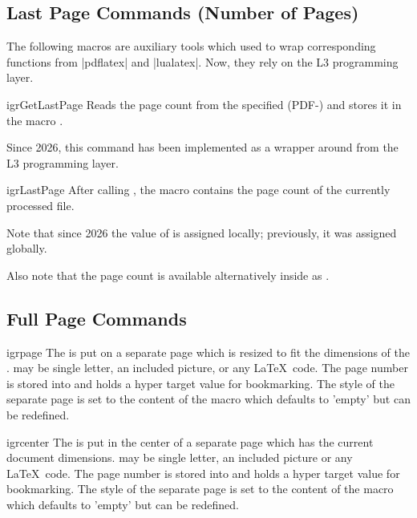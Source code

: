 \documentclass[a4paper,11pt]{ltxdoc}
\begin{document}
\subsection{Last Page Commands (Number of Pages)}

The following macros are auxiliary tools which used to wrap corresponding functions
from |pdflatex| and |lualatex|. Now, they rely on the L3 programming layer.

\begin{docCommand}[doc new and updated={2021-10-18}{2026-02-25}]{igrGetLastPage}{}
  Reads the page count from the specified (PDF-) and stores it in
  the macro .\par
  Since 2026, this command has been implemented as a wrapper around
   from the L3 programming layer.
\end{docCommand}


\begin{docCommand}[doc new and updated={2021-10-18}{2026-02-25}]{igrLastPage}{}
  After calling , the macro  contains
  the page count of the currently processed file.\par
  Note that since 2026 the value of  is assigned locally;
  previously, it was assigned globally.\par
  Also note that the page count is available alternatively inside
   as .
\end{docCommand}


\clearpage
\subsection{Full Page Commands}

\begin{docCommand}{igrpage}{}
  The  is put on a separate page which is resized to fit the
  dimensions of the .  may be single letter, an
  included picture, or any \LaTeX\ code.
  The page number is stored into  and
   holds a hyper target value for bookmarking.
  The style of the separate page is set to
  the content of the macro
   which defaults to 'empty' but can be
  redefined.
\end{docCommand}

\begin{docCommand}{igrcenter}{}
  The  is put in the center of a separate page which has the
  current document dimensions.  may be single letter, an
  included picture or any \LaTeX\ code.
  The page number is stored into  and
   holds a hyper target value for bookmarking.
  The style of the separate page is set to
  the content of the macro
   which defaults to 'empty' but can be
  redefined.
\end{docCommand}
\end{document}
